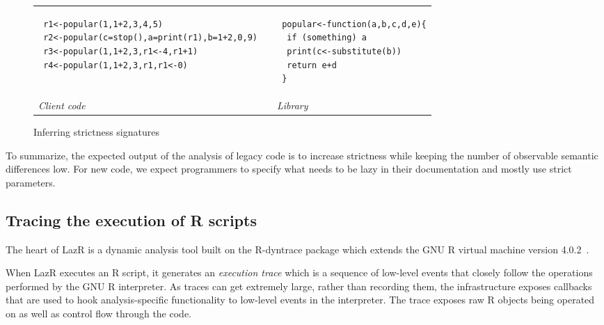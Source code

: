 \documentclass[review,nonacm,screen,acmsmall,anonymous=true]{acmart}
\newcommand{\rdyn}{{\sf R-dyntrace}\xspace}
\newcommand{\lazr}{{\sf LazR}\xspace}
\begin{document}
\begin{figure}[!h]
\begin{tabular}{lll}
  \begin{minipage}{7cm}
\begin{lstlisting}
 r1<-popular(1,1+2,3,4,5)
 r2<-popular(c=stop(),a=print(r1),b=1+2,0,9)
 r3<-popular(1,1+2,3,r1<-4,r1+1)
 r4<-popular(1,1+2,3,r1,r1<-0)
\end{lstlisting}
\end{minipage}
&&
\begin{minipage}{5cm}
\begin{lstlisting}
 popular<-function(a,b,c,d,e){
  if (something) a
  print(c<-substitute(b))
  return e+d
 }
\end{lstlisting}
\end{minipage}\\
\it Client code&& \it Library
\end{tabular}%
\caption{Inferring strictness signatures}\label{iss}
\end{figure}

To summarize, the expected output of the analysis of legacy code is to increase
strictness while keeping the number of observable semantic differences low. For
new code, we expect programmers to specify what needs to be lazy in their
documentation and mostly use strict parameters.

\subsection{Tracing the execution of R scripts}

The heart of \lazr is a dynamic analysis tool built on the \rdyn package which
extends the GNU R virtual machine version 4.0.2~\cite{oopsla19b}.

When \lazr executes an R script, it generates an \emph{execution trace} which is
a sequence of low-level events that closely follow the operations performed by
the GNU R interpreter. As traces can get extremely large, rather than recording
them, the infrastructure exposes callbacks that are used to hook
analysis-specific functionality to low-level events in the interpreter. The
trace exposes raw R objects being operated on as
well as control flow through the code.
\end{document}
